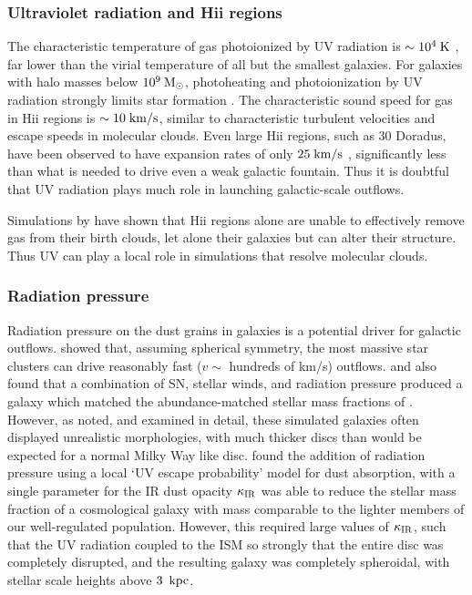 \subsubsection{Ultraviolet radiation and {\sc Hii} regions}
The characteristic temperature of gas photoionized by UV radiation is
$\sim10^{4}\>{\rm K}$ \citep{Krumholz2009}, far lower than the virial temperature of
all but the smallest galaxies.  For galaxies with halo masses below $10^9\>{\rm M_{\odot}}$,
photoheating and photoionization by UV radiation strongly limits star formation
\citep{Efstathiou1992}.  The characteristic sound speed for gas in {\sc Hii}
regions is $\sim10\;\rm{km/s}$, similar to characteristic turbulent velocities
and escape speeds in molecular clouds.  Even large {\sc Hii} regions, such as 30
Doradus, have been observed to have expansion rates of only $25\;\rm{km/s}$
\citep{Chu1994}, significantly less than what is needed to drive even a weak
galactic fountain.  Thus it is doubtful that UV radiation plays much role in
launching galactic-scale outflows.  

Simulations by \citet{Dale2012} have shown that {\sc Hii} regions alone are
unable to effectively remove gas from their birth clouds, let alone their
galaxies but can alter their structure.  Thus UV can play a local role in
simulations that resolve molecular clouds.

\subsubsection{Radiation pressure}
Radiation pressure on the dust grains in galaxies is a potential driver for
galactic outflows.  \citet{Murray2011} showed that, assuming spherical symmetry,
the most massive star clusters can drive reasonably fast ($v\sim$ hundreds of
km/s) outflows.  \citet{Agertz2015} and \citet{Hopkins2014} also found that a
combination of SN, stellar winds, and radiation pressure produced a galaxy which
matched the abundance-matched stellar mass fractions of \citet{Behroozi2013}.
However, as \citet{Agertz2015} noted, and \citet{Roskar2014} examined in detail,
these simulated galaxies often displayed unrealistic morphologies, with much
thicker discs than would be expected for a normal Milky Way like disc.
\citet{Roskar2014} found the addition of radiation pressure using a local `UV
escape probability' model for dust absorption, with a single parameter for the
IR dust opacity $\kappa_{\rm IR}$ was able to reduce the stellar mass fraction of a
cosmological galaxy with mass comparable to the lighter members of our
well-regulated population.  However, this required large values of
$\kappa_{\rm IR}$, such that the UV radiation coupled to the ISM so strongly that
the entire disc was completely disrupted, and the resulting galaxy was
completely spheroidal, with stellar scale heights above $3\;\>{\rm kpc}$.

